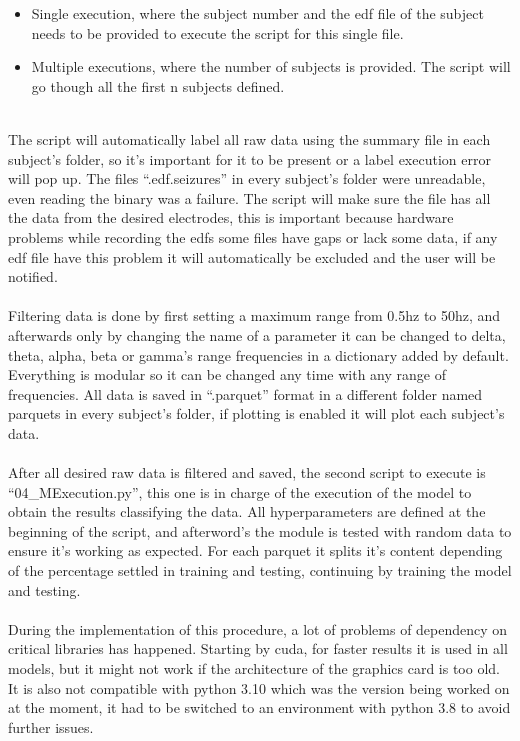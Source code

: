 \begin{itemize}
    \item Single execution, where the subject number and the edf file of the subject needs to be provided to execute the script for this single file. 
    \item Multiple executions, where the number of subjects is provided. The script will go though all the first n subjects defined.
\end{itemize}
\leavevmode\\
The script will automatically label all raw data using the summary file in each subject’s folder, so it’s important for it to be present or a label execution error will pop up. The files “.edf.seizures” in every subject’s folder were unreadable, even reading the binary was a failure. The script will make sure the file has all the data from the desired electrodes, this is important because hardware problems while recording the edfs some files have gaps or lack some data, if any edf file have this problem it will automatically be excluded and the user will be notified.
\\\\
Filtering data is done by first setting a maximum range from 0.5hz to 50hz, and afterwards only by changing the name of a parameter it can be changed to delta, theta, alpha, beta or gamma’s range frequencies in a dictionary added by default. Everything is modular so it can be changed any time with any range of frequencies. All data is saved in “.parquet” format in a different folder named parquets in every subject’s folder, if plotting is enabled it will plot each subject’s data.
\\\\
After all desired raw data is filtered and saved, the second script to execute is “04\_MExecution.py”, this one is in charge of the execution of the model to obtain the results classifying the data. All hyperparameters are defined at the beginning of the script, and afterword’s the module is tested with random data to ensure it’s working as expected. For each parquet it splits it’s content depending of the percentage settled in training and testing, continuing by training the model and testing.
\\\\
During the implementation of this procedure, a lot of problems of dependency on critical libraries has happened. Starting by cuda, for faster results it is used in all models, but it might not work if the architecture of the graphics card is too old. It is also not compatible with python 3.10 which was the version being worked on at the moment, it had to be switched to an environment with python 3.8 to avoid further issues.
\\\\
\leavevmode\\

